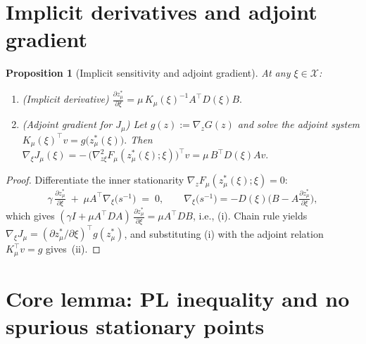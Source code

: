 \documentclass[11pt]{article}
\newtheorem{proposition}{Proposition}
\theoremstyle{remark}
\begin{document}
\section{Implicit derivatives and adjoint gradient}

\begin{proposition}[Implicit sensitivity and adjoint gradient]
\label{prop:implicit}
At any $\xi\in\mathcal{X}$: \vspace{-0.25em}
\begin{enumerate}[leftmargin=2em,label=(\roman*)]
\item (Implicit derivative)
\(
\displaystyle
\frac{\partial z^*_\mu}{\partial \xi}
=
\mu\,K_\mu(\xi)^{-1} A^\top D(\xi) B .
\)
\item (Adjoint gradient for $J_\mu$)
Let $g(z):=\nabla_z G(z)$ and solve the adjoint system
\(
K_\mu(\xi)^\top v = g\!\big(z^*_\mu(\xi)\big).
\)
Then
\(
\nabla_\xi J_\mu(\xi)
=
-\,\big(\nabla^2_{z\xi} F_\mu(z^*_\mu(\xi);\xi)\big)^\top v
=
\mu\,B^\top D(\xi) A v .
\)
\end{enumerate}
\end{proposition}

\begin{proof}
Differentiate the inner stationarity $\nabla_z F_\mu(z^*_\mu(\xi);\xi)=0$:
\[
\gamma \,\tfrac{\partial z^*_\mu}{\partial \xi}
\;+\;
\mu A^\top \nabla_\xi\!\big(s^{-1}\big)
\;=\; 0,
\qquad
\nabla_\xi\!\big(s^{-1}\big) = -D(\xi)\big(B - A\tfrac{\partial z^*_\mu}{\partial \xi}\big),
\]
which gives $(\gamma I + \mu A^\top D A)\,\tfrac{\partial z^*_\mu}{\partial \xi}=\mu A^\top D B$, i.e., (i). Chain rule yields $\nabla_\xi J_\mu=(\partial z^*_\mu/\partial \xi)^\top g(z^*_\mu)$, and substituting (i) with the adjoint relation $K_\mu^\top v=g$ gives~(ii).
\end{proof}

\section{Core lemma: PL inequality and no spurious stationary points}
\end{document}
